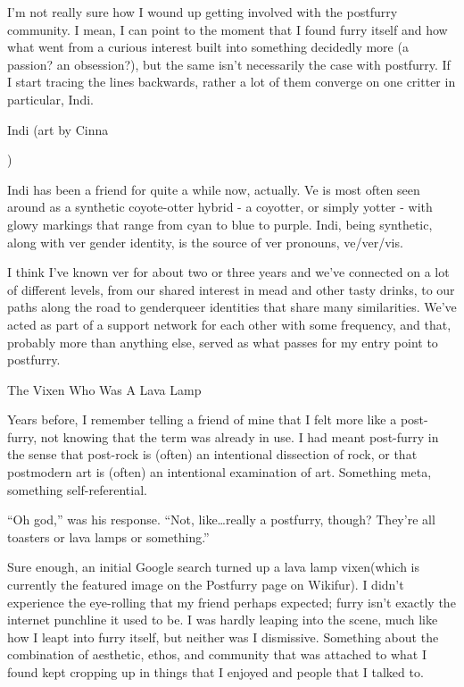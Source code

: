 
I'm not really sure how I wound up getting involved with the postfurry community. I mean, I can point to the moment that I found furry itself and how what went from a curious interest built into something decidedly more (a passion? an obsession?), but the same isn't necessarily the case with postfurry. If I start tracing the lines backwards, rather a lot of them converge on one critter in particular, Indi.

 Indi (art by Cinna

)

Indi has been a friend for quite a while now, actually.{ }Ve is most often seen around as a synthetic coyote-otter hybrid - a coyotter, or simply yotter - with glowy markings that range from cyan to blue to purple. Indi, being synthetic, along with ver gender identity, is the source of ver pronouns, ve/ver/vis.

I think I've known ver for about two or three years and we've connected on a lot of different levels, from our shared interest in mead and other tasty drinks, to our paths along the road to genderqueer identities that share many similarities. We've acted as part of a support network for each other with some frequency, and that, probably more than anything else, served as what passes for my entry point to postfurry.

The Vixen Who Was A Lava Lamp

Years before, I remember telling a friend of mine that I felt more like a post-furry, not knowing that the term was already in use.{ }I had meant post-furry in the sense that post-rock is (often) an intentional dissection of rock, or that postmodern art is (often) an intentional examination of art.{ }Something meta, something self-referential.

``Oh god,'' was his response.{ }``Not, like\ldots{}really a postfurry, though?{ }They're all toasters or lava lamps or something.''

Sure enough, an initial Google search turned up a lava lamp vixen(which is currently the featured image on the Postfurry page on Wikifur).{ }I didn't experience the eye-rolling that my friend perhaps expected; furry isn't exactly the internet punchline it used to be.{ }I was hardly leaping into the scene, much like how I leapt into furry itself, but neither was I dismissive.{ }Something about the combination of aesthetic, ethos, and community that was attached to what I found kept cropping up in things that I enjoyed and people that I talked to.

